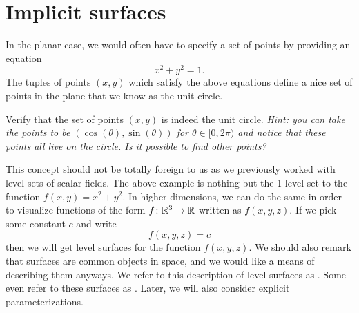 \section{Implicit  surfaces}
                In the planar case, we would often have to specify a set of points by providing an equation
                \[
                x^2+y^2=1.
                \]
                The tuples of points $(x,y)$ which satisfy the above equations define a nice set of points in the plane that we know as the unit circle.

                \begin{exercise}
                	Verify that the set of points $(x,y)$ is indeed the unit circle. \emph{Hint: you can take the points to be $(\cos(\theta),\sin(\theta))$ for $\theta \in [0,2\pi)$ and notice that these points all live on the circle. Is it possible to find other points?}
                 \end{exercise}

                This concept should not be totally foreign to us as we previously worked with level sets of scalar fields.  The above example is nothing but the 1 level set to the function $f(x,y)=x^2+y^2$.  In higher dimensions, we can do the same in order to visualize functions of the form $f\colon \mathbb{R}^3\to \mathbb{R}$ written as $f(x,y,z)$.  If we pick some constant $c$ and write
                \[
                f(x,y,z)=c
                \]
                then we will get level surfaces for the function $f(x,y,z)$.  We should also remark that surfaces are common objects in space, and we would like a means of describing them anyways. We refer to this description of level surfaces as . Some even refer to these surfaces as .  Later, we will also consider explicit parameterizations.

